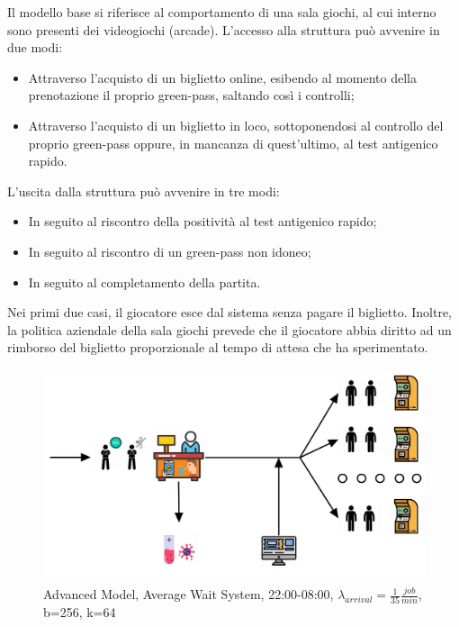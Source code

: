 \documentclass{article}
\begin{document}
Il modello base si riferisce al comportamento di una sala giochi, al cui interno sono presenti dei videogiochi (arcade). L'accesso alla struttura può avvenire in due modi:
\begin{itemize}
\item Attraverso l'acquisto di un biglietto online, esibendo al momento della prenotazione il proprio green-pass, saltando così i controlli;
\item Attraverso l'acquisto di un biglietto in loco, sottoponendosi al controllo del proprio green-pass oppure, in mancanza di quest'ultimo, al test antigenico rapido. 
\end{itemize}
L'uscita dalla struttura può avvenire in tre modi:
\begin{itemize}
\item In seguito al riscontro della positività al test antigenico rapido;
\item In seguito al riscontro di un green-pass non idoneo;
\item In seguito al completamento della partita.
\end{itemize}
Nei primi due casi, il giocatore esce dal sistema senza pagare il biglietto.
Inoltre, la politica aziendale della sala giochi prevede che il giocatore abbia diritto ad un rimborso del biglietto proporzionale al tempo di attesa che ha sperimentato.
\begin{figure}[H]
	\centering
	\captionsetup{justification=centering,margin=2cm}
	\includegraphics[scale=1]{images/schema.jpg}
	\caption{Advanced Model, Average Wait System, 22:00-08:00, $\lambda_{arrival}=\frac{1}{35} \frac{job}{min}$, b=256, k=64}\label{figura:schema}
\end{figure}
\end{document}
